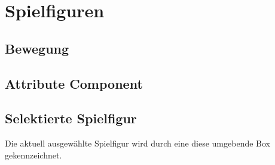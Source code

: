\chapter{Spielfiguren}

\section{Bewegung}

\section{Attribute Component}

\section{Selektierte Spielfigur}
Die aktuell ausgewählte Spielfigur wird durch eine diese umgebende Box gekennzeichnet.